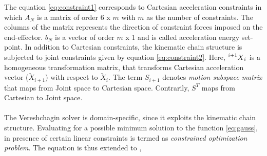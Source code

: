  The equation \ref{eq:constraint1} corresponds to Cartesian acceleration constraints in which $A_N$ is a matrix of order 6 x $m$ with $m$ as the number of constraints. The columns of the matrix represents the direction of constraint forces imposed on the end-effector. $b_N$ is a vector of order $m$ x 1 and is called acceleration energy set-point. In addition to Cartesian constraints, the kinematic chain structure is subjected to joint constraints given by equation \ref{eq:constraint2}. Here, $\prescript{i+1}{}{X}_i$ is a homogeneous transformation matrix, that transforms Cartesian acceleration vector ($\ddot{X}_{i+1}$) with respect to $\ddot{X}_i$. The term $S_{i+1}$ denotes \textit{motion subspace matrix} that maps from Joint space to Cartesian space. Contrarily, $S^T$ maps from Cartesian to Joint space.

% 


\paragraph{}The Vereshchagin solver is domain-specific, since it exploits the kinematic chain structure. Evaluating for a possible minimum solution to the function \ref{eq:gauss}, in presence of certain linear constraints is termed as \textit{constrained optimization problem}. The equation is thus extended to \cite{shakhimardanov2015composable}, 

